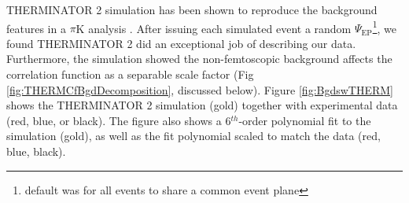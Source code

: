 \documentclass[/home/jesse/Analysis/FemtoAnalysis/AnalysisNotes/AnalysisNoteJBuxton.tex]{subfiles}
\begin{document}
THERMINATOR 2 simulation has been shown to reproduce the background features in a $\pi$K analysis \cite{Kisiel:2017}.  
After issuing each simulated event a random $\Psi_{\mathrm{EP}}$\footnote{default was for all events to share a common event plane}, we found THERMINATOR 2 did an exceptional job of describing our data.  
Furthermore, the simulation showed the non-femtoscopic background affects the correlation function as a separable scale factor (Fig \ref{fig:THERMCfBgdDecomposition}, discussed below).
Figure \ref{fig:BgdswTHERM} shows the THERMINATOR 2 simulation (gold) together with experimental data (red, blue, or black).  
The figure also shows a 6$^{th}$-order polynomial fit to the simulation (gold), as well as the fit polynomial scaled to match the data (red, blue, black).


\begin{figure}[h!]
  \centering

\end{figure}
\end{document}
